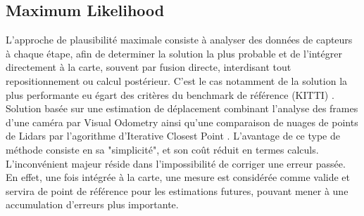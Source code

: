 \documentclass[twoside,twocolumn]{article}
\begin{document}
\subsection{Maximum Likelihood}
L'approche de plausibilité maximale consiste à analyser des données de capteurs à chaque étape, afin de determiner
la solution la plus probable et de l'intégrer directement à la carte, souvent par fusion directe, interdisant tout
repositionnement ou calcul postérieur. C'est le cas notamment de la solution la plus performante \cite{zhang_visual-lidar_2015}
eu égart des critères du benchmark de référence (KITTI) \cite{_kitti_????}. Solution basée sur une estimation de déplacement
combinant l'analyse des frames d'une caméra par Visual Odometry \cite{nister_visual_2004} ainsi qu'une comparaison de nuages de
points de Lidars par l'agorithme d'Iterative Closest Point \cite{pomerleau_review_2015}. L'avantage de ce type de méthode consiste en
sa "simplicité", et son coût réduit en termes calculs. L'inconvénient majeur réside dans l'impossibilité de corriger une erreur passée.
En effet, une fois intégrée à la carte, une mesure est considérée comme valide et servira de point de référence pour les estimations futures,
pouvant mener à une accumulation d'erreurs plus importante.
\end{document}
